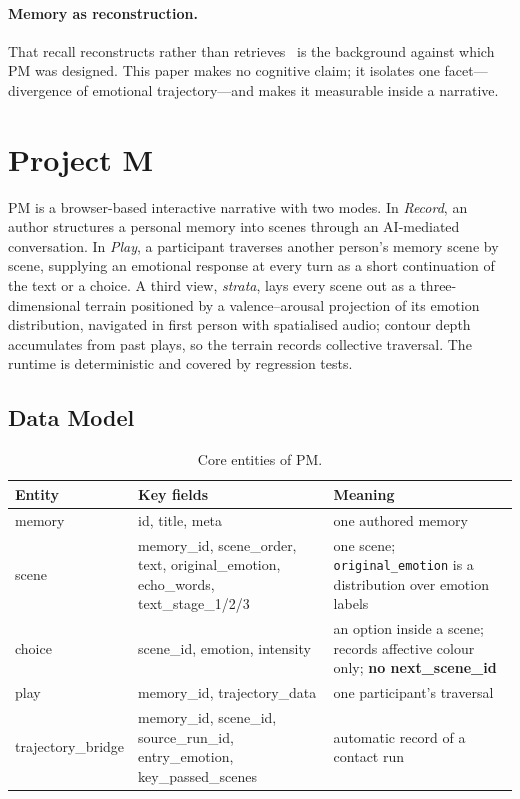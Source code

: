 \documentclass[runningheads]{llncs}
\newcommand{\sys}{Project M}
\newcommand{\sysshort}{PM}
\begin{document}
\paragraph{Memory as reconstruction.}
That recall reconstructs rather than retrieves~\cite{bartlett1932,loftus1974,nader2000,hirst2012} is the background against which \sysshort{} was designed. This paper makes no cognitive claim; it isolates one facet---divergence of emotional trajectory---and makes it measurable inside a narrative.

\section{\sys}

\sysshort{} is a browser-based interactive narrative with two modes. In \emph{Record}, an author structures a personal memory into scenes through an AI-mediated conversation. In \emph{Play}, a participant traverses another person's memory scene by scene, supplying an emotional response at every turn as a short continuation of the text or a choice. A third view, \emph{strata}, lays every scene out as a three-dimensional terrain positioned by a valence--arousal projection of its emotion distribution, navigated in first person with spatialised audio; contour depth accumulates from past plays, so the terrain records collective traversal. The runtime is deterministic and covered by regression tests.

\subsection{Data Model}
\label{sec:data}

\begin{table}[t]
\caption{Core entities of \sysshort.}
\label{tab:data}
\centering
\footnotesize
\begin{tabular}{@{}l >{\raggedright\arraybackslash}p{4.9cm} >{\raggedright\arraybackslash}p{4.0cm}@{}}
\toprule
\textbf{Entity} & \textbf{Key fields} & \textbf{Meaning} \\
\midrule
memory & id, title, meta & one authored memory \\
scene & memory\_id, scene\_order, text, original\_emotion, echo\_words, text\_stage\_1/2/3 & one scene; \texttt{original\_emotion} is a distribution over emotion labels \\
choice & scene\_id, emotion, intensity & an option inside a scene; records affective colour only; \textbf{no next\_scene\_id} \\
play & memory\_id, trajectory\_data & one participant's traversal \\
trajectory\_bridge & memory\_id, scene\_id, source\_run\_id, entry\_emotion, key\_passed\_scenes & automatic record of a contact run \\
\bottomrule
\end{tabular}
\end{table}
\end{document}
